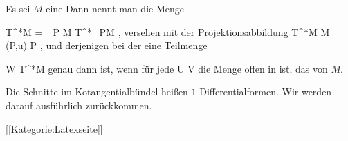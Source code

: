 {}
{

Es sei $M$ eine
Dann nennt man die Menge

\mavergleichskettedisp
{\vergleichskette
{ T^*M
}
{ =} {\biguplus_{P \in M} T^*_PM
}
{ } {
}
{ } {
}
{ } {
}
}
{}{}{,}
versehen mit der Projektionsabbildung
\maabbeledisp {\pi} { T^*M } { M
} { (P,u) } { P
} {,}
und derjenigen
bei der eine Teilmenge

\mavergleichskette
{\vergleichskette
{ W
}
{ \subseteq }{ T^*M
}
{  }{
}
{    }{
}
{   }{
}
}
{}{}{}
genau dann
ist, wenn für jede
\maabbdisp {\alpha} { U } { V
} {}
die Menge
 offen in
 ist, das  von $M$.

}
Die Schnitte im Kotangentialbündel heißen $1$-Differentialformen. Wir werden darauf ausführlich zurückkommen.

 [[Kategorie:Latexseite]]
